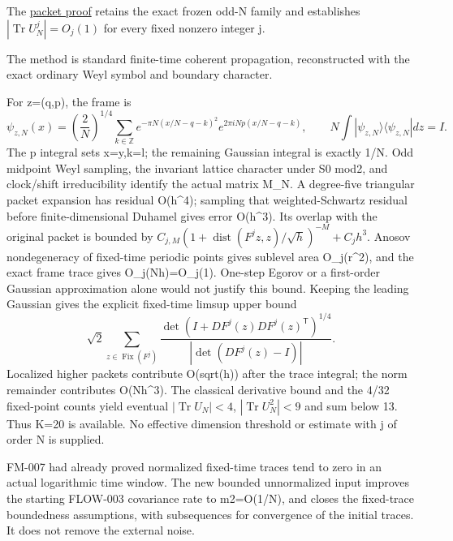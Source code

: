 \begin{theorem}\label{pass2:frontier-fm-013}

The \href{https://github.com/ChurilovMaksim/BGS/blob/main/mathematics/fixed_time_wavepacket_trace_bound.md}{packet proof}
retains the exact frozen odd-N family and establishes
\(|\operatorname{Tr}U_N^j|=O_j(1)\) for every fixed nonzero integer j.

\end{theorem}

The method is standard finite-time coherent propagation, reconstructed
with the exact ordinary Weyl symbol and boundary character.

For z=(q,p), the frame is
\[
\psi_{z,N}(x)=\left(\frac2N\right)^{1/4}\sum_{k\in\mathbb Z}
 e^{-\pi N(x/N-q-k)^2}e^{2\pi iNp(x/N-q-k)},
\qquad N\int|\psi_{z,N}\rangle\langle\psi_{z,N}|dz=I.
\]
The p integral sets x=y,k=l; the remaining Gaussian integral is exactly
1/N. Odd midpoint Weyl sampling, the invariant lattice character under
S0 mod2, and clock/shift irreducibility identify the actual matrix M\_N.
A degree-five triangular packet expansion has residual O(h\^{}4); sampling
that weighted-Schwartz residual before finite-dimensional Duhamel gives
error O(h\^{}3). Its overlap with the original packet is bounded by
\(C_{j,M}(1+\operatorname{dist}(F^jz,z)/\sqrt h)^{-M}+C_jh^3\).
Anosov nondegeneracy of fixed-time periodic points gives sublevel area
O\_j(r\^{}2), and the exact frame trace gives O\_j(Nh)=O\_j(1).
One-step Egorov or a first-order Gaussian approximation alone would not
justify this bound. Keeping the leading Gaussian gives the explicit
fixed-time limsup upper bound
\[
\sqrt2\sum_{z\in\operatorname{Fix}(F^j)}
\frac{\det(I+DF^j(z)DF^j(z)^{\mathsf T})^{1/4}}
{|\det(DF^j(z)-I)|}.
\]
Localized higher packets contribute O(sqrt(h)) after the trace integral;
the norm remainder contributes O(Nh\^{}3). The classical derivative bound
and the 4/32 fixed-point counts yield eventual
\(|\operatorname{Tr}U_N|<4\), \(|\operatorname{Tr}U_N^2|<9\) and sum below 13.
Thus K=20 is available. No effective dimension threshold or estimate
with j of order N is supplied.

FM-007 had already proved normalized fixed-time traces tend to zero in
an actual logarithmic time window. The new bounded unnormalized input
improves the starting FLOW-003 covariance rate to \textbar m2\textbar=O(1/N), and closes
the fixed-trace boundedness assumptions, with subsequences for convergence
of the initial traces. It does not remove the external noise.

